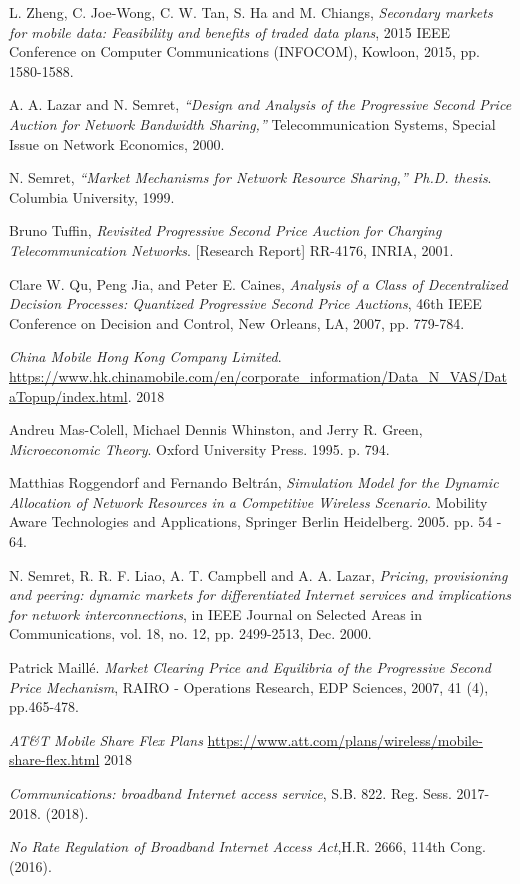 \documentclass[sigconf, anonymous]{acmart}
\theoremstyle{definition}
\begin{document}
\begin{thebibliography}{9}

L. Zheng, C. Joe-Wong, C. W. Tan, S. Ha and M. Chiangs, 
\textit{Secondary markets for mobile data: Feasibility and benefits of traded
data plans}, 2015 IEEE
Conference on Computer Communications (INFOCOM), Kowloon, 2015, pp. 1580-1588.

A. A. Lazar and N. Semret, 
\textit{“Design and Analysis of the Progressive Second Price Auction for Network
Bandwidth Sharing,”} Telecommunication Systems, Special Issue on Network Economics, 2000.

N. Semret, 
\textit{“Market Mechanisms for Network Resource Sharing,”
Ph.D. thesis}. 
Columbia University, 1999.

Bruno Tuffin,
\textit{Revisited Progressive Second Price Auction for Charging
Telecommunication Networks}.
[Research Report] RR-4176, INRIA, 2001.

Clare W. Qu, Peng Jia, and Peter E. Caines,
\textit{Analysis of a Class of Decentralized Decision Processes: Quantized
Progressive Second Price Auctions},
46th IEEE Conference on Decision and Control, New Orleans, LA, 2007, pp.
779-784.

\textit{China Mobile Hong Kong Company Limited}.
\url{https://www.hk.chinamobile.com/en/corporate_information/Data_N_VAS/DataTopup/index.html}.
2018

Andreu Mas-Colell, Michael Dennis Whinston, and Jerry R. Green, 
\textit{Microeconomic Theory}. Oxford University Press. 1995. p. 794.

Matthias Roggendorf and Fernando Beltr{\'a}n,
\textit{Simulation Model for the Dynamic Allocation of Network Resources in a
Competitive Wireless Scenario}. Mobility Aware Technologies and Applications, Springer Berlin Heidelberg. 2005.
pp. 54 - 64.

N. Semret, R. R. F. Liao, A. T. Campbell and A. A. Lazar, 
\textit{Pricing, provisioning and peering: dynamic markets for differentiated Internet services and
implications for network interconnections}, in IEEE Journal on Selected Areas in
Communications, vol. 18, no. 12, pp. 2499-2513, Dec. 2000.

Patrick Maillé.
\textit{Market Clearing Price and Equilibria of the Progressive Second Price
Mechanism},
RAIRO - Operations Research, EDP Sciences, 2007, 41 (4), pp.465-478.

\textit{AT\&T Mobile Share Flex Plans}
\url{https://www.att.com/plans/wireless/mobile-share-flex.html}
2018

\textit{Communications: broadband Internet access service}, S.B. 822. Reg. Sess.
2017-2018. (2018).

\textit{No Rate Regulation of Broadband Internet Access Act},H.R. 2666, 114th
Cong. (2016).


\end{thebibliography}
\end{document}
